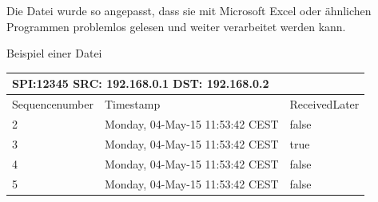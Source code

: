 \noindent Die Datei wurde so angepasst, dass sie mit Microsoft Excel oder ähnlichen Programmen problemlos gelesen und weiter verarbeitet werden kann.

\noindent 

\noindent Beispiel einer Datei

\begin{tabular}{|p{0.9in}|p{1.7in}|p{0.8in}|} \hline 
\multicolumn{2}{|p{1in}|}{SPI:12345 SRC: 192.168.0.1 DST: 192.168.0.2} &  \\ \hline 
Sequencenumber & Timestamp & ReceivedLater \\ \hline 
2 & Monday, 04-May-15 11:53:42 CEST & false \\ \hline 
3 & Monday, 04-May-15 11:53:42 CEST & true \\ \hline 
4 & Monday, 04-May-15 11:53:42 CEST & false \\ \hline 
5 & Monday, 04-May-15 11:53:42 CEST & false \\ \hline 
\end{tabular}



\noindent 
